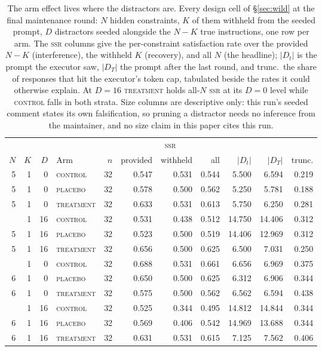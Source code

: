 \begin{table}[t]
  \centering\small
  \begin{tabular}{@{}rrrlrrrrrrr@{}}
    \toprule
    & & & & & \multicolumn{3}{c}{\textsc{ssr}} & & & \\
    \cmidrule(lr){6-8}
    $N$ & $K$ & $D$ & Arm & $n$ & provided & withheld & all & $|D_t|$ & $|D_T|$ & trunc. \\
    \midrule
    5 & 1 & 0 & \textsc{control} & 32 & 0.547 & 0.531 & 0.544 & 5.500 & 6.594 & 0.219 \\
    5 & 1 & 0 & \textsc{placebo} & 32 & 0.578 & 0.500 & 0.562 & 5.250 & 5.781 & 0.188 \\
    5 & 1 & 0 & \textsc{treatment} & 32 & 0.633 & 0.531 & 0.613 & 5.750 & 6.250 & 0.281 \\
    \addlinespace
    5 & 1 & 16 & \textsc{control} & 32 & 0.531 & 0.438 & 0.512 & 14.750 & 14.406 & 0.312 \\
    5 & 1 & 16 & \textsc{placebo} & 32 & 0.523 & 0.500 & 0.519 & 14.406 & 12.969 & 0.312 \\
    5 & 1 & 16 & \textsc{treatment} & 32 & 0.656 & 0.500 & 0.625 & 6.500 & 7.031 & 0.250 \\
    \addlinespace
    6 & 1 & 0 & \textsc{control} & 32 & 0.688 & 0.531 & 0.661 & 6.656 & 6.969 & 0.375 \\
    6 & 1 & 0 & \textsc{placebo} & 32 & 0.650 & 0.500 & 0.625 & 6.312 & 6.906 & 0.344 \\
    6 & 1 & 0 & \textsc{treatment} & 32 & 0.575 & 0.500 & 0.562 & 6.562 & 6.594 & 0.438 \\
    \addlinespace
    6 & 1 & 16 & \textsc{control} & 32 & 0.525 & 0.344 & 0.495 & 14.812 & 14.844 & 0.344 \\
    6 & 1 & 16 & \textsc{placebo} & 32 & 0.569 & 0.406 & 0.542 & 14.969 & 13.688 & 0.344 \\
    6 & 1 & 16 & \textsc{treatment} & 32 & 0.631 & 0.531 & 0.615 & 7.125 & 7.562 & 0.406 \\
    \bottomrule
  \end{tabular}
  \caption{
    The arm effect lives where the distractors are. Every design cell of \S\ref{sec:wild} at the
    final maintenance round: $N$ hidden constraints, $K$ of them withheld from the seeded prompt,
    $D$ distractors seeded alongside the $N{-}K$ true instructions, one row per arm. The
    \textsc{ssr} columns give the per-constraint satisfaction rate over the provided $N{-}K$
    (interference), the withheld $K$ (recovery), and all $N$ (the headline); $|D_t|$ is the prompt
    the executor saw, $|D_T|$ the prompt after the last round, and trunc.\ the share of responses
    that hit the executor's token cap, tabulated beside the rates it could otherwise explain. At
    $D{=}16$ \textsc{treatment} holds all-$N$ \textsc{ssr} at its $D{=}0$ level while
    \textsc{control} falls in both strata. Size columns are descriptive only: this run's seeded
    comment states its own falsification, so pruning a distractor needs no inference from the
    maintainer, and no size claim in this paper cites this run.
  }
  \label{tab:wildgrid}
\end{table}
